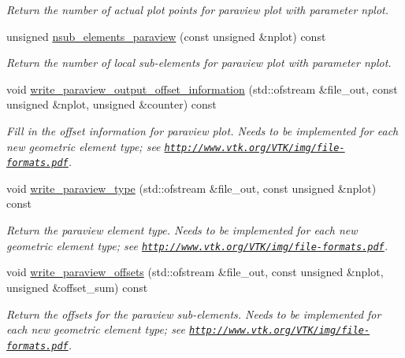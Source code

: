 \begin{DoxyCompactItemize}
\begin{DoxyCompactList}\small\item\em Return the number of actual plot points for paraview plot with parameter nplot. \end{DoxyCompactList}\item 
unsigned \hyperlink{classoomph_1_1TElement_3_012_00_01NNODE__1D_01_4_acbd9eea53952435fe3a1c7c1aef1312a}{nsub\+\_\+elements\+\_\+paraview} (const unsigned \&nplot) const
\begin{DoxyCompactList}\small\item\em Return the number of local sub-\/elements for paraview plot with parameter nplot. \end{DoxyCompactList}\item 
void \hyperlink{classoomph_1_1TElement_3_012_00_01NNODE__1D_01_4_a74e9ef1bdd8bbf4d7c2300004c13a151}{write\+\_\+paraview\+\_\+output\+\_\+offset\+\_\+information} (std\+::ofstream \&file\+\_\+out, const unsigned \&nplot, unsigned \&counter) const
\begin{DoxyCompactList}\small\item\em Fill in the offset information for paraview plot. Needs to be implemented for each new geometric element type; see \href{http://www.vtk.org/VTK/img/file-formats.pdf}{\tt http\+://www.\+vtk.\+org/\+V\+T\+K/img/file-\/formats.\+pdf}. \end{DoxyCompactList}\item 
void \hyperlink{classoomph_1_1TElement_3_012_00_01NNODE__1D_01_4_a076e986424d283bbf44db36bce8f498a}{write\+\_\+paraview\+\_\+type} (std\+::ofstream \&file\+\_\+out, const unsigned \&nplot) const
\begin{DoxyCompactList}\small\item\em Return the paraview element type. Needs to be implemented for each new geometric element type; see \href{http://www.vtk.org/VTK/img/file-formats.pdf}{\tt http\+://www.\+vtk.\+org/\+V\+T\+K/img/file-\/formats.\+pdf}. \end{DoxyCompactList}\item 
void \hyperlink{classoomph_1_1TElement_3_012_00_01NNODE__1D_01_4_a33b8548c4cdd2c28f663d47a5e616487}{write\+\_\+paraview\+\_\+offsets} (std\+::ofstream \&file\+\_\+out, const unsigned \&nplot, unsigned \&offset\+\_\+sum) const
\begin{DoxyCompactList}\small\item\em Return the offsets for the paraview sub-\/elements. Needs to be implemented for each new geometric element type; see \href{http://www.vtk.org/VTK/img/file-formats.pdf}{\tt http\+://www.\+vtk.\+org/\+V\+T\+K/img/file-\/formats.\+pdf}. \end{DoxyCompactList}\item 

\end{DoxyCompactItemize}

